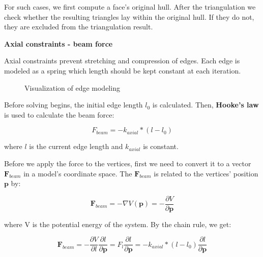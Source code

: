 For such cases, we first compute a face's original hull. After the triangulation we check whether the resulting triangles
lay within the original hull. If they do not, they are excluded from the triangulation result.

\textbf{Axial constraints - beam force}
\smallskip

Axial constraints prevent stretching and compression of edges. 
Each edge is modeled as a spring which length should be kept constant at each iteration.

\begin{figure}[H]
	\caption{Visualization of edge modeling}
    \centering
    \qquad
\end{figure}

Before solving begins, the initial edge length $l_{0}$ is calculated.
Then, \textbf{Hooke's law} is used to calculate the beam force:

$$F_{beam} = -k_{axial} * (l - l_{0})$$

where $l$ is the current edge length and $k_{axial}$ is constant.

\smallskip
Before we apply the force to the vertices, first we need to convert it to a vector $\pmb{F}_{beam}$ in a model's coordinate space.
The $\pmb{F}_{beam}$ is related to the vertices' position $\pmb{p}$ by:

$$\pmb{F}_{beam} = -\nabla V(\pmb{p}) = -\frac{\partial V}{\partial \pmb{p}}$$

where V is the potential energy of the system. By the chain rule, we get:

\begin{equation} \label{Solver:beam_force}
\pmb{F}_{beam} = -\frac{\partial V}{\partial l}\frac{\partial l}{\partial \pmb{p}} = F_{l}\frac{\partial l}{\partial \pmb{p}} = -k_{axial} * (l - l_{0})\frac{\partial l}{\partial \pmb{p}}
\end{equation}


